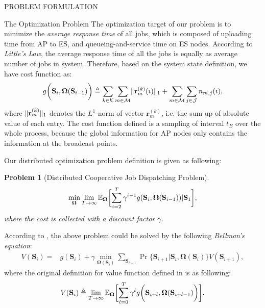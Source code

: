 \documentclass[10pt, conference, letterpaper]{IEEEtran}
\newtheorem{problem}{Problem}
\newcommand{\define}{\triangleq}
\renewcommand{\vec}{\mathbf}
\DeclarePairedDelimiter{\Inorm}{\|}{\|_1}
\DeclarePairedDelimiter{\Paren}{\bigg(}{\bigg)}
\DeclarePairedDelimiter{\Bracket}{\bigg[}{\bigg]}
\newcommand{\apSet}{\mathcal{K}}
\newcommand{\esSet}{\mathcal{M}}
\newcommand{\jSpace}{\mathcal{J}}
\newcommand{\Stat}{\mathbf{S}}
\newcommand{\Policy}{\mathbf{\Omega}}
\begin{document}
\begin{section}{PROBLEM FORMULATION}
        \begin{subsection}{The Optimization Problem}
            The optimization target of our problem is to minimize the \emph{average response time} of all jobs, which is composed of uploading time from AP to ES, and queueing-and-service time on ES nodes. According to \emph{Little's Law}, the average response time of all the jobs is equally as average number of jobs in system. Therefore, based on the system state definition, we have cost function as:
            \begin{align}
                g\Paren{\Stat_{i}, \Policy(\Stat_{i-1})} \define
                        \sum_{k\in\apSet}\sum_{m\in\esSet} \Inorm{\vec{r}^{(k)}_{m}(i)} +
                        \sum_{m\in\esSet}\sum_{j\in\jSpace} n_{m,j}(i),
            \end{align}
            where $\Inorm{\vec{r}^{(k)}_{m}}$ denotes the $L^1$-norm of vector $\vec{r}^{(k)}_{m}$, i.e. the sum up of absolute value of each entry. The cost function defined is a sampling of interval $t_B$ over the whole process, because the global information for AP nodes only contains the information at the broadcast points.

            Our distributed optimization problem definition is given as following:
            \begin{problem}[Distributed Cooperative Job Dispatching Problem]
                \begin{gather}
                    \min_{\Policy} \lim_{T \to \infty}
                        \mathbb{E}_{\Policy}
                            \Bracket{\sum_{i=2}^{T} \gamma^{i-1} g(\Stat_{i}, \Policy(\Stat_{i-1}))|\Stat_1},
                \end{gather}
                where the cost is collected with a discount factor $\gamma$.
            \end{problem}

            According to \cite{sutton1998introduction}, the above problem could be solved by the following \emph{Bellman's equation}:
            \begin{align}
                V(\Stat_{i}) =& g(\Stat_i) + \gamma \min_{\Policy(\Stat_{i})} \sum_{\Stat_{i+1}} \Pr\{ \Stat_{i+1}|\Stat_{i}, \Policy(\Stat_{i}) \} V(\Stat_{i+1}),
            \end{align}
            where the original definition for value function defined in \cite{sutton1998introduction} is as following:
            \begin{align}
                V(\Stat_{i}) \define \lim_{T\to\infty}
                    \mathbb{E}_{\Policy}\Bracket{
                        \sum_{l=0}^{T} \gamma^l g\Paren{\Stat_{i+l}, \Policy(\Stat_{i+l-1})}
                    }.
            \end{align}


\end{subsection}
\end{section}
\end{document}
